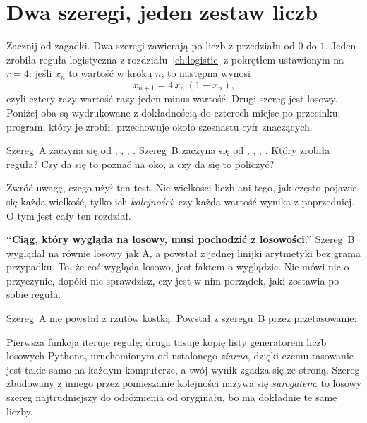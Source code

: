 \section{Dwa szeregi, jeden zestaw liczb}
\label{sec:ch15-twins}

\noindent
Zacznij od zagadki. Dwa szeregi zawierają po  liczb z przedziału
od $0$ do $1$. Jeden zrobiła reguła logistyczna z rozdziału~\ref{ch:logistic}
z pokrętłem ustawionym na $r = 4$: jeśli $x_n$ to wartość w kroku $n$, to
następna wynosi
\[ x_{n+1} = 4\,x_n\,(1 - x_n), \]
czyli cztery razy wartość razy jeden minus wartość. Drugi szereg jest losowy.
Poniżej oba są wydrukowane z dokładnością do czterech miejsc po przecinku;
program, który je zrobił, przechowuje około szesnastu cyfr znaczących.

\begin{think}
Szereg~A zaczyna się od , , ,
. Szereg~B zaczyna się od , ,
, . Który zrobiła reguła? Czy da się to poznać
na oko, a czy da się to policzyć?
\end{think}
Zwróć uwagę, czego użył ten test. Nie wielkości liczb ani tego, jak często
pojawia się każda wielkość, tylko ich \emph{kolejności}: czy każda wartość
wynika z poprzedniej. O tym jest cały ten rozdział.

\begin{trapbox}
\textbf{\enquote{Ciąg, który wygląda na losowy, musi pochodzić z losowości.}}
Szereg~B wyglądał na równie losowy jak A, a powstał z jednej linijki
arytmetyki bez grama przypadku. To, że coś wygląda losowo, jest faktem o
wyglądzie. Nie mówi nic o przyczynie, dopóki nie sprawdzisz, czy jest w nim
porządek, jaki zostawia po sobie reguła.
\end{trapbox}

\noindent
Szereg~A nie powstał z rzutów kostką. Powstał z szeregu~B przez
przetasowanie:


\noindent
Pierwsza funkcja iteruje regułę; druga tasuje kopię listy generatorem liczb
losowych Pythona, uruchomionym od ustalonego \emph{ziarna}, dzięki czemu
tasowanie jest takie samo na każdym komputerze, a twój wynik zgadza się ze
stroną. Szereg zbudowany z innego przez pomieszanie kolejności nazywa się
\emph{surogatem}: to losowy szereg najtrudniejszy do odróżnienia od
oryginału, bo ma dokładnie te same liczby.


